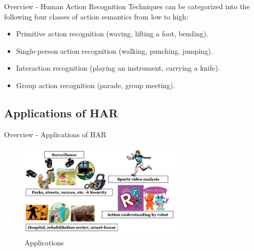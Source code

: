 \begin{frame}{Overview - Human Action Recognition}
    Techniques can be categorized into the following four classes of action semantics from low to high:
    \begin{itemize}
        \item Primitive action recognition (waving, lifting a foot, bending).
        \item Single-person action recognition (walking, punching, jumping).
        \item Interaction recognition (playing an instrument, carrying a knife).
        \item Group action recognition (parade, group meeting).
    \end{itemize}
\end{frame}

\subsection{Applications of HAR}
\begin{frame}{Overview - Applications of HAR}
    \begin{figure}[htp]
        \centering
        \includegraphics[width=0.7\textwidth]{topics/201010-zhang2019comprehensive/assets/img/application.png}
        \caption{Applications}
        \label{fig:applications}
    \end{figure}
\end{frame}

